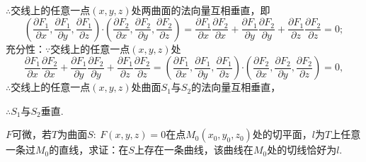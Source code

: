\documentclass[12pt,UTF8]{ctexart}
\begin{document}
\begin{enumerate}
$\therefore$交线上的任意一点$(x,y,z)$处两曲面的法向量互相垂直，即
\[
(\frac{\partial F_1}{\partial x},\frac{\partial F_1}{\partial y},\frac{\partial F_1}{\partial z})\bm\cdot(\frac{\partial F_2}{\partial x},\frac{\partial F_2}{\partial y},\frac{\partial F_2}{\partial z})=\frac{\partial F_1}{\partial x}\frac{\partial F_2}{\partial x}+\frac{\partial F_1}{\partial y}\frac{\partial F_2}{\partial y}+\frac{\partial F_1}{\partial z}\frac{\partial F_2}{\partial z}=0;
\]
充分性：$\because$交线上的任意一点$(x,y,z)$处
\[
\frac{\partial F_1}{\partial x}\frac{\partial F_2}{\partial x}+\frac{\partial F_1}{\partial y}\frac{\partial F_2}{\partial y}+\frac{\partial F_1}{\partial z}\frac{\partial F_2}{\partial z}=(\frac{\partial F_1}{\partial x},\frac{\partial F_1}{\partial y},\frac{\partial F_1}{\partial z})\bm\cdot(\frac{\partial F_2}{\partial x},\frac{\partial F_2}{\partial y},\frac{\partial F_2}{\partial z})=0,
\]
$\therefore$交线上的任意一点$(x,y,z)$处曲面$S_1$与$S_2$的法向量互相垂直，

$\therefore S_1$与$S_2$垂直.

$F$可微，若$T$为曲面$S:\ F(x,y,z)=0$在点$M_0(x_0,y_0,z_0)$处的切平面，$l$为$T$上任意一条过$M_0$的直线，求证：在$S$上存在一条曲线，该曲线在$M_0$处的切线恰好为$l$.


\end{enumerate}
\end{document}
